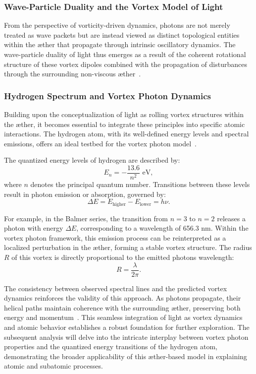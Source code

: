 \subsubsection*{Wave-Particle Duality and the Vortex Model of Light}\label{subsubsec:wave-particle-duality}
From the perspective of vorticity-driven dynamics, photons are not merely treated as wave packets but are instead viewed as distinct topological entities within the æther that propagate through intrinsic oscillatory dynamics.
The wave-particle duality of light thus emerges as a result of the coherent rotational structure of these vortex dipoles combined with the propagation of disturbances through the surrounding non-viscous æther~\cite{kleckner2016, orlandi2021}.

\subsubsection*{Hydrogen Spectrum and Vortex Photon Dynamics}
Building upon the conceptualization of light as rolling vortex structures within the æther, it becomes essential to integrate these principles into specific atomic interactions.
The hydrogen atom, with its well-defined energy levels and spectral emissions, offers an ideal testbed for the vortex photon model~\cite{maxwell1861, clausius1865}.

The quantized energy levels of hydrogen are described by:
\begin{equation*}
    E_n = -\frac{13.6}{n^2} \text{ eV},\label{eq:quantized energy levels}
\end{equation*}
where $n$ denotes the principal quantum number.
Transitions between these levels result in photon emission or absorption, governed by:
\begin{equation*}
    \Delta E = E_\text{higher} - E_\text{lower} = h \nu.\label{eq:emission or absorption}
\end{equation*}

For example, in the Balmer series, the transition from $n=3$ to $n=2$ releases a photon with energy $\Delta E$, corresponding to a wavelength of 656.3 nm.
Within the vortex photon framework, this emission process can be reinterpreted as a localized perturbation in the æther, forming a stable vortex structure.
The radius $R$ of this vortex is directly proportional to the emitted photon\rqs s wavelength:
\begin{equation*}
    R = \frac{\lambda}{2\pi}.\label{eq:photon wavelength}
\end{equation*}

The consistency between observed spectral lines and the predicted vortex dynamics reinforces the validity of this approach.
As photons propagate, their helical paths maintain coherence with the surrounding æther, preserving both energy and momentum~\cite{verlinde2010, raymer2007}.
This seamless integration of light as vortex dynamics and atomic behavior establishes a robust foundation for further exploration.
The subsequent analysis will delve into the intricate interplay between vortex photon properties and the quantized energy transitions of the hydrogen atom, demonstrating the broader applicability of this æther-based model in explaining atomic and subatomic processes.



